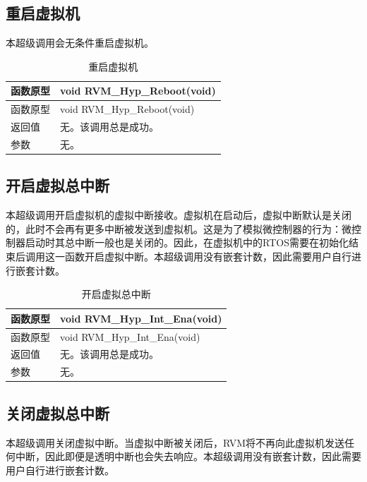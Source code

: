 \subsection{重启虚拟机}\label{subsec:4-4-2}

本超级调用会无条件重启虚拟机。

\begin{xltabular}{\textwidth}{@{}>{\hsize\raggedright\arraybackslash}X>{\hsize\raggedright\arraybackslash}X@{}}
\caption{重启虚拟机}\label{tab:4-6}\\
\toprule
函数原型 & void RVM\_\allowbreak{}Hyp\_\allowbreak{}Reboot(void)\tabularnewline
\endfirsthead
\toprule
函数原型 & void RVM\_\allowbreak{}Hyp\_\allowbreak{}Reboot(void)\tabularnewline
\midrule
\endhead
\bottomrule
\endlastfoot
返回值 & 无。该调用总是成功。\tabularnewline
参数 & 无。\tabularnewline
\end{xltabular}

\subsection{开启虚拟总中断}\label{subsec:4-4-3}

本超级调用开启虚拟机的虚拟中断接收。虚拟机在启动后，虚拟中断默认是关闭的，此时不会再有更多中断被发送到虚拟机。这是为了模拟微控制器的行为：微控制器启动时其总中断一般也是关闭的。因此，在虚拟机中的RTOS需要在初始化结束后调用这一函数开启虚拟中断。本超级调用没有嵌套计数，因此需要用户自行进行嵌套计数。

\begin{xltabular}{\textwidth}{@{}>{\hsize\raggedright\arraybackslash}X>{\hsize\raggedright\arraybackslash}X@{}}
\caption{开启虚拟总中断}\label{tab:4-7}\\
\toprule
函数原型 & void RVM\_\allowbreak{}Hyp\_\allowbreak{}Int\_\allowbreak{}Ena(void)\tabularnewline
\endfirsthead
\toprule
函数原型 & void RVM\_\allowbreak{}Hyp\_\allowbreak{}Int\_\allowbreak{}Ena(void)\tabularnewline
\midrule
\endhead
\bottomrule
\endlastfoot
返回值 & 无。该调用总是成功。\tabularnewline
参数 & 无。\tabularnewline
\end{xltabular}

\subsection{关闭虚拟总中断}\label{subsec:4-4-4}

本超级调用关闭虚拟中断。当虚拟中断被关闭后，RVM将不再向此虚拟机发送任何中断，因此即便是透明中断也会失去响应。本超级调用没有嵌套计数，因此需要用户自行进行嵌套计数。


